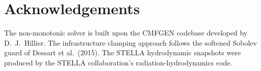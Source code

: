 \documentclass[11pt,a4paper]{article}
\begin{document}
\section*{Acknowledgements}

The non-monotonic solver is built upon the CMFGEN codebase developed by
D.~J.~Hillier.  The infrastructure clamping approach follows the
softened Sobolev guard of Dessart et al.\ (2015).  The STELLA
hydrodynamic snapshots were produced by the STELLA collaboration's
radiation-hydrodynamics code.
\end{document}
